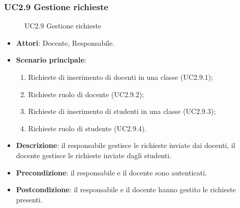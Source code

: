 \subsubsection{UC2.9 Gestione richieste}
\begin{figure}[H]
\centering
\noindent{}
\caption{UC2.9 Gestione richieste}
\end{figure}
\begin{itemize}
\item \textbf{Attori}: Docente, Responsabile.
\item \textbf{Scenario principale}:
\begin{enumerate}
\item Richieste di inserimento di docenti in una classe (UC2.9.1);
\item Richieste ruolo di docente (UC2.9.2);
\item Richieste di inserimento di studenti in una classe (UC2.9.3);
\item Richieste ruolo di studente (UC2.9.4).
\end{enumerate}
\item \textbf{Descrizione}: il responsabile gestisce le richieste inviate dai docenti, il docente gestisce le richieste inviate dagli studenti.
\item \textbf{Precondizione}: il responsabile e il docente sono autenticati.
\item \textbf{Postcondizione}: il responsabile e il docente hanno gestito le richieste presenti.
\end{itemize}
